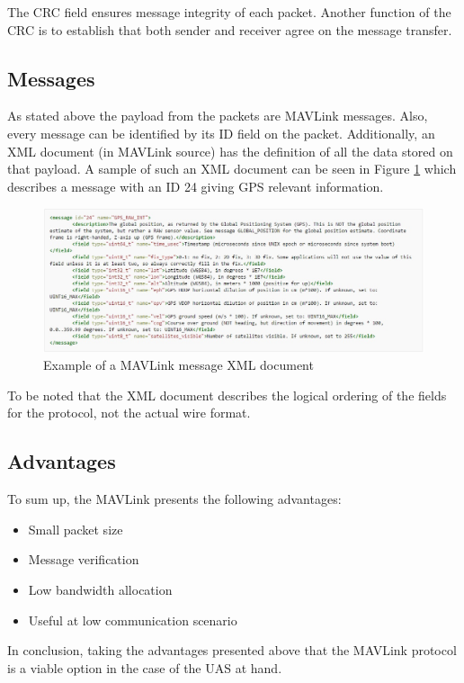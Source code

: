 The CRC field ensures message integrity of each packet. Another function of the CRC is to establish that both sender and receiver agree on the message transfer.

\subsection{Messages}
As stated above the payload from the packets are MAVLink messages. Also, every message can be identified by its ID field on the packet. Additionally, an XML document (in MAVLink source) has the definition of all the data stored on that payload. A sample of such an XML document can be seen in Figure \ref{fig:mav_msg} which describes a message with an ID 24 giving GPS relevant information.

\begin{figure}[hb]
	\centering
	\includegraphics[scale=0.5]{figures/mavlink_msg.jpg}
	\caption{Example of a MAVLink message XML document}
	\label{fig:mav_msg}
\end{figure}

To be noted that the XML document describes the logical ordering of the fields for the protocol, not the actual wire format.

\subsection{Advantages}
To sum up, the MAVLink presents the following advantages:
\begin{itemize}
	\item Small packet size
	\item Message verification
	\item Low bandwidth allocation
	\item Useful at low communication scenario
\end{itemize}

In conclusion, taking the advantages presented above that the MAVLink protocol is a viable option in the case of the UAS at hand.
